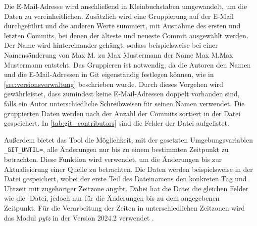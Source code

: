 Die E-Mail-Adresse wird anschließend in Kleinbuchstaben umgewandelt, um die Daten zu vereinheitlichen.
Zusätzlich wird eine Gruppierung auf der E-Mail durchgeführt und die anderen Werte summiert, mit Ausnahme des ersten und letzten Commits, bei denen der älteste und neueste Commit ausgewählt werden.
Der Name wird hintereinander gehängt, sodass beispielsweise bei einer Namensänderung von \glqq Max M.\grqq{} zu \glqq Max Mustermann\grqq{} der Name \glqq Max M.Max Mustermann\grqq{} entsteht.
Das Gruppieren ist notwendig, da die Autoren den Namen und die E-Mail-Adressen in Git eigenständig festlegen können, wie in \autoref{sec:versionsverwaltung} beschrieben wurde.
Durch dieses Vorgehen wird gewährleistet, dass zumindest keine E-Mail-Adressen doppelt vorhanden sind, falls ein Autor unterschiedliche Schreibweisen für seinen Namen verwendet.
Die gruppierten Daten werden nach der Anzahl der Commits sortiert in der Datei  gespeichert.
In \autoref{tab:git_contributors} sind die Felder der Datei aufgelistet.

Außerdem bietet das Tool die Möglichkeit, mit der gesetzten Umgebungsvariablen \texttt{\_GIT\_UNTIL=}, alle Änderungen nur bis zu einem bestimmten Zeitpunkt zu betrachten.
Diese Funktion wird verwendet, um die Änderungen bis zur Aktualisierung einer Quelle zu betrachten.
Die Daten werden beispielsweise in der Datei  gespeichert, wobei der erste Teil des Dateinamens den konkreten Tag und Uhrzeit mit zugehöriger Zeitzone angibt.
Dabei hat die Datei die gleichen Felder wie die -Datei, jedoch nur für die Änderungen bis zu dem angegebenen Zeitpunkt.
Für die Verarbeitung der Zeiten in unterschiedlichen Zeitzonen wird das Modul \emph{pytz} in der Version 2024.2 verwendet \autocite{bishop_pytz_2024}.

